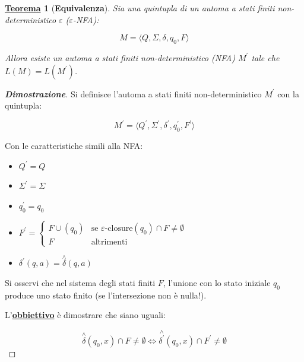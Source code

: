 \documentclass[a4paper]{article}
\newtheorem{theorem}{\textcolor{Red3}{\underline{Teorema}}}
\begin{document}
	\begin{theorem}[\textbf{Equivalenza}]
		Sia una quintupla di un automa a stati finiti non-deterministico $\varepsilon$ ($\varepsilon$-NFA):
		
		\begin{equation*}
			M = \langle Q, \Sigma, \delta, q_{0}, F \rangle
		\end{equation*}
	
		\noindent
		Allora esiste un automa a stati finiti non-deterministico (NFA) $M^{'}$ tale che $L\left(M\right) = L\left(M^{'}\right)$.
	\end{theorem}

	\begin{proof}[\textbf{Dimostrazione}]
		Si definisce l'automa a stati finiti non-deterministico $M^{'}$ con la quintupla:
		
		\begin{equation*}
			M^{'} = \langle Q^{'}, \Sigma^{'}, \delta^{'}, q_{0}^{'}, F^{'} \rangle
		\end{equation*}
	
		\noindent
		Con le caratteristiche simili alla NFA:
		
		\begin{itemize}
			\item $Q^{'} = Q$
			\item $\Sigma^{'} = \Sigma$
			\item $q_{0}^{'} = q_{0}$
			\item $F^{'} =
				\begin{cases}
					F \cup \left(q_{0}\right) 	& \text{se } \varepsilon\text{-closure}\left(q_{0}\right) \cap F \ne \emptyset \\
					F 							& \text{altrimenti}
				\end{cases}$
			\item $\delta^{'} \left(q,a\right) = \overset{\wedge}{\delta}\left(q,a\right)$
		\end{itemize}
	
		\noindent
		Si osservi che nel sistema degli stati finiti $F$, l'unione con lo stato iniziale $q_{0}$ produce uno stato finito (se l'intersezione non è nulla!).
		
		\noindent
		L'\textbf{\underline{obbiettivo}} è dimostrare che siano uguali:
		
		\begin{equation*}
			\overset{\wedge}{\delta}\left(q_{0}, x\right) \cap F \ne \emptyset \iff \overset{\wedge}{\delta^{'}}\left(q_{0}, x\right) \cap F^{'} \ne \emptyset
		\end{equation*}
		

\end{proof}
\end{document}
